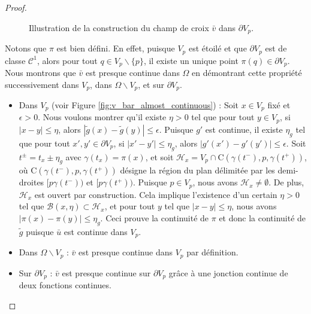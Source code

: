 \begin{proof}
\begin{figure}[!h]
\caption{Illustration de la construction du champ de croix $\bar{v}$ dans $\partial V_p$.}
\label{fig:illustr_etoilage}
\end{figure}
Notons que $\pi$ est bien défini. En effet, puisque $V_p$ est étoilé et que $\partial V_p$ est de classe $\mathcal{C}^1$, alors pour tout $q\in V_p\backslash\{p\}$, il existe un unique point $\pi(q)\in\partial V_p$. Nous montrons que $\bar{v}$ est presque continue dans $\Omega$ en démontrant cette propriété successivement dans $V_p$, dans $\Omega\backslash V_p$, et sur $\partial V_p$.\\
\begin{itemize}
\item Dans $V_p$ (voir Figure \ref{fig:v_bar_almost_continuous}) : Soit $x \in V_p$ fixé et $\epsilon > 0$. Nous voulons montrer qu'il existe $\eta > 0$ tel que pour tout $y \in V_p$, si $|x-y|\leq\eta$, alors $|\widetilde{g}(x)-\widetilde{g}(y)|\leq\epsilon$. Puisque $g'$ est continue, il existe $\eta_g$ tel que pour tout $x', y' \in \partial V_p$, si $|x'-y'|\leq\eta_g$, alors $|g'(x')-g'(y')|\leq\epsilon$. Soit $t^\pm=t_x\pm\eta_g$ avec $\gamma(t_x)=\pi(x)$, et soit $\mathcal{H}_x=V_p\cap\mathrm{C}(\gamma(t^-), p, \gamma(t^+))$, où $\mathrm{C}(\gamma(t^-), p, \gamma(t^+))$ désigne la région du plan délimitée par les demi-droites $[p\gamma(t^-))$ et $[p\gamma(t^+))$. Puisque $p\in V_p$, nous avons $\mathcal{H}_x \neq\emptyset$. De plus, $\mathcal{H}_x$ est ouvert par construction. Cela implique l'existence d'un certain $\eta>0$ tel que $\mathcal{B}(x,\eta)\subset \mathcal{H}_x$, et pour tout $y$ tel que $|x-y|\leq\eta$, nous avons $|\pi(x)-\pi(y)|\leq\eta_g$. Ceci prouve la continuité de $\pi$ et donc la continuité de $\widetilde{g}$ puisque $\bar{u}$ est continue dans $V_p$.\\
\item Dans $\Omega\backslash V_p$ : $\bar{v}$ est presque continue dans $V_p$ par définition.\\
\item Sur $\partial V_p$ : $\bar{v}$ est presque continue sur $\partial V_p$ grâce à une jonction continue de deux fonctions continues.\\
\end{itemize}
\begin{figure}[!h]
\centering

\end{figure}
\end{proof}
